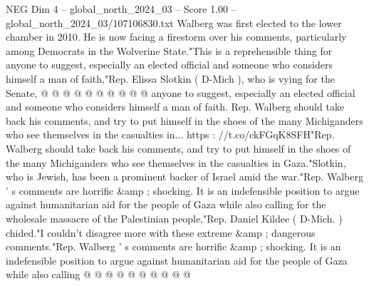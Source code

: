 \begin{textsample}{NEG Dim 4 – global\_north\_2024\_03 – Score 1.00 – global\_north\_2024\_03/107106830.txt}
Walberg was first elected to the lower chamber in 2010.
He is now facing a firestorm over his comments, particularly among Democrats in the Wolverine State."This is a reprehensible thing for anyone to suggest, especially an elected official and someone who considers himself a man of faith,"Rep.
Elissa Slotkin ( D-Mich ), who is vying for the Senate, @ @ @ @ @ @ @ @ @ @ anyone to suggest, especially an elected official and someone who considers himself a man of faith.
Rep.
Walberg should take back his comments, and try to put himself in the shoes of the many Michiganders who see themselves in the casualties in... https : //t.co/ckFGqK8SFH"Rep.
Walberg should take back his comments, and try to put himself in the shoes of the many Michiganders who see themselves in the casualties in Gaza."Slotkin, who is Jewish, has been a prominent backer of Israel amid the war."Rep.
Walberg ' s comments are horrific \&amp ; shocking.
It is an indefensible position to argue against humanitarian aid for the people of Gaza while also calling for the wholesale massacre of the Palestinian people,"Rep.
Daniel Kildee ( D-Mich. ) chided."I couldn't disagree more with these extreme \&amp ; dangerous comments."Rep.
Walberg ' s comments are horrific \&amp ; shocking.
It is an indefensible position to argue against humanitarian aid for the people of Gaza while also calling @ @ @ @ @ @ @ @ @ @

\end{textsample}
